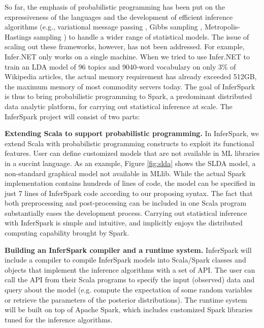 \documentclass[a4paper,12pt,oneside,onecolumn,final]{book}
\newcommand{\figref}[1]{Figure \ref{#1}}
\newcounter{enum}
\newenvironment{packed_enum}{
\begin{list}{R\arabic{enum}.}{
  \setlength{\itemsep}{-1pt}
  \setlength{\parskip}{0.5pt}
  \setlength{\labelwidth}{30 pt}
  \setlength{\leftmargin}{20 pt}
  \setlength{\itemindent}{1pt}
  \usecounter{enum}}
}{\end{list}}
\begin{document}
So far, the emphasis of probabilistic programming has been put on the
expressiveness of the languages and the development of efficient inference
algorithms (e.g., variational message passing \cite{vmp}, Gibbs sampling \cite{gibbs},
Metropolis-Hastings sampling \cite{mh}) to handle a wider range of statistical
models.  The issue of scaling out these frameworks, however, has not been
addressed.  For example, Infer.NET only works on a single machine.  
When we tried to use Infer.NET to train an LDA model of 96 topics and 9040-word
vocabulary on only 3\% of Wikipedia articles, the actual memory
requirement has already exceeded 512GB, the maximum memory of most commodity
servers today.
The goal of InferSpark is thus to bring 
probabilistic programming to Spark, a predominant distributed data
analytic platform, for carrying out statistical inference at scale. 
The InferSpark project will consist of two parts:

\begin{packed_enum}
	\item {\bf Extending Scala to support probabilistic programming.}
	In InferSpark, we extend Scala with probabilistic programming constructs
	to exploit its functional features. User can define customized models
	that are not available in ML libraries in a succint language. 
	As an example, \figref{fig:slda} shows the SLDA model, a non-standard
        graphical model not available in MLlib. While the actual Spark 
	implementation contains hundreds of lines of code, the model can be 
	specified in just 7 lines of InferSpark code according to our proposing syntax. The fact
	that both preprocessing and post-processing can be included in one Scala
	program substantially eases the development process. Carrying out
	statistical inference with InferSpark is simple and intuitive, and
	implicitly enjoys the distributed computing capability brought by Spark.

	\item {\bf Building an InferSpark compiler and a runtime system.}
	InferSpark will include a compiler to compile InferSpark models into
	Scala/Spark classes and objects that implement the inference algorithms
	with a set of API. The user can call the API from their Scala programs to
	specify the input (observed) data and query about the model (e.g. compute
	the expectation of some random variables or retrieve the parameters of the
	posterior distributions). The runtime system will be built on top of
	Apache Spark, which includes customized Spark libraries tuned for the
	inference algorithms.
		
\end{packed_enum}
\end{document}
